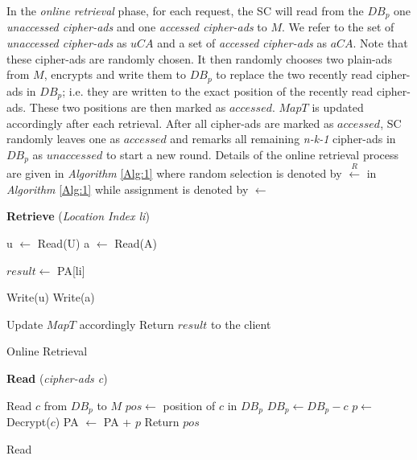 In the \textit{online retrieval} phase, for each request, the SC will read from the $DB_p$ one \textit{unaccessed cipher-ads} and one \textit{accessed cipher-ads} to $M$. We refer to the set of \textit{unaccessed cipher-ads} as $uCA$ and a set of  \textit{accessed cipher-ads} as $aCA$.
Note that these cipher-ads are randomly chosen. It then randomly chooses two plain-ads from $M$, encrypts and write them to $DB_p$ to replace the two recently read cipher-ads in $DB_p$; i.e. they are written to the exact position of the recently read cipher-ads. These two positions are then marked as $accessed$. $MapT$ is updated accordingly after each retrieval. After all cipher-ads are marked as $accessed$, SC randomly leaves one as $accessed$ and remarks all remaining \textit{n-k-1} cipher-ads in $DB_p$ as $unaccessed$ to start a new round. 
Details of the online retrieval process are given in \textit{Algorithm} \ref{Alg:1} where random selection is denoted by $\xleftarrow{R}$ in \textit{Algorithm} \ref{Alg:1} while assignment is denoted by $\gets$ 

\begin{algorithm}
\label{Alg:1}
\vspace{-10pt}

\hrulefill
\vspace{-5pt}

 \textbf{Retrieve }(\textit{Location Index li})\\
 \vspace{-10pt}

\hrulefill


  u $\gets$ Read(U)\;
  a $\gets$ Read(A)\;
  
  $result \gets$ PA[li]\;
  	 
  
  Write(u)\;
  Write(a)\;
  
  
  Update $MapT$ accordingly\;
  Return $result$ to the client\;	
 \vspace{-8pt} 
\hrulefill

\caption{Online Retrieval}
\end{algorithm}


\begin{algorithm}
\hrulefill
\vspace{-5pt}

 \textbf{Read }(\textit{cipher-ads c})\\
 \vspace{-10pt}
\hrulefill

 Read $c$ from $DB_p$ to $M$\;
 $pos \gets$ position of $c$ in $DB_p$\;
 $DB_p \gets DB_p - c$\;
 $p \gets$ Decrypt($c$)\;
 PA $\gets$ PA + $p$\;
 Return $pos$\;
 \vspace{-8pt} 
\hrulefill

\caption{Read}
\end{algorithm}




